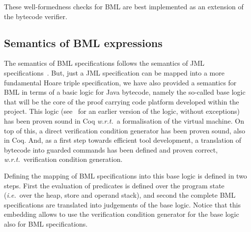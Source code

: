 These well-formedness checks for BML are best implemented as an
extension of the bytecode verifier.
 



\subsection{Semantics of BML expressions}

The semantics of BML specifications follows the semantics of JML
specifications~\cite{JMLReferenceManual05}. But, just a JML
specification can be mapped into a more fundamental Hoare triple
specification, we have also provided a semantics for BML in terms of a
basic logic for Java bytecode, namely the so-called
\mobius base logic that will be the core of the proof carrying code platform
developed within the project. This logic (see~\cite{BeringerH06} for
an earlier version of the logic, without exceptions) has been proven
sound in Coq \emph{w.r.t.}\ a formalisation of the virtual machine. On
top of this, a direct verification condition generator has been proven
sound, also in Coq. And, as a first step towards efficient tool
development, a translation of bytecode into guarded commands has been
defined and proven correct, \emph{w.r.t.}\ verification condition
generation.

Defining the mapping of BML specifications into this \mobius base
logic is defined in two steps. First the evaluation of predicates is
defined over the program state (\emph{i.e.}\ over the heap, store and
operand stack), and second the complete BML specifications are
translated into judgements of the \mobius base logic. Notice that this
embedding allows to use the verification condition generator for the
\mobius base logic also for BML specifications.

